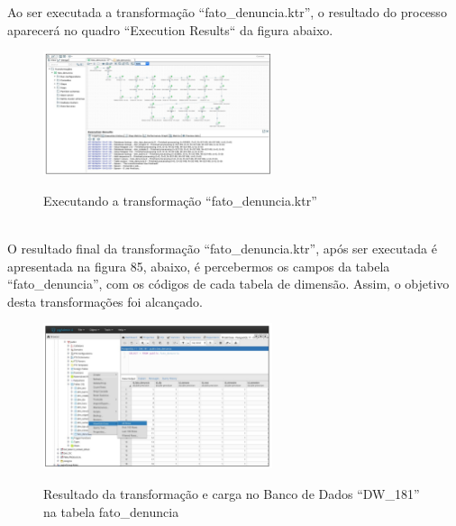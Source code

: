 Ao ser executada a transforma\c{c}\~{a}o ``fato\_denuncia.ktr'', o resultado do 
processo aparecer\'{a} no quadro ``Execution Results`` da figura abaixo.

\begin{figure}[H]
	\vspace*{0,2cm}
    \centering
    \caption{Executando a transforma\c{c}\~{a}o ``fato\_denuncia.ktr''}
    \includegraphics[width=0.6\textwidth]{./04-figuras/figura-trans-fato-denuncia}
    \label{fig:ilustfigtransfatodenuncia}
\end{figure}
\vspace*{-0,9cm}
{\raggedright {}} \\

O resultado final da transforma\c{c}\~{a}o ``fato\_denuncia.ktr'', ap\'{o}s ser executada \'{e} apresentada na figura 85, 
abaixo, \'{e} percebermos os campos da tabela ``fato\_denuncia'', com os c\'{o}digos de cada tabela de dimens\~{a}o.
Assim, o objetivo desta transforma\c{c}\~{o}es foi alcan\c{c}ado.

\begin{figure}[H]
	\vspace*{0,2cm}
    \centering
    \caption{Resultado da transforma\c{c}\~{a}o e carga no Banco de Dados ``DW\_181'' na tabela fato\_denuncia}
    \includegraphics[width=0.6\textwidth]{./04-figuras/figura-res-fato-denuncia}
    \label{fig:ilustfigresfatodenuncia}
\end{figure}
\vspace*{-0,9cm}
{\raggedright {}} \\

